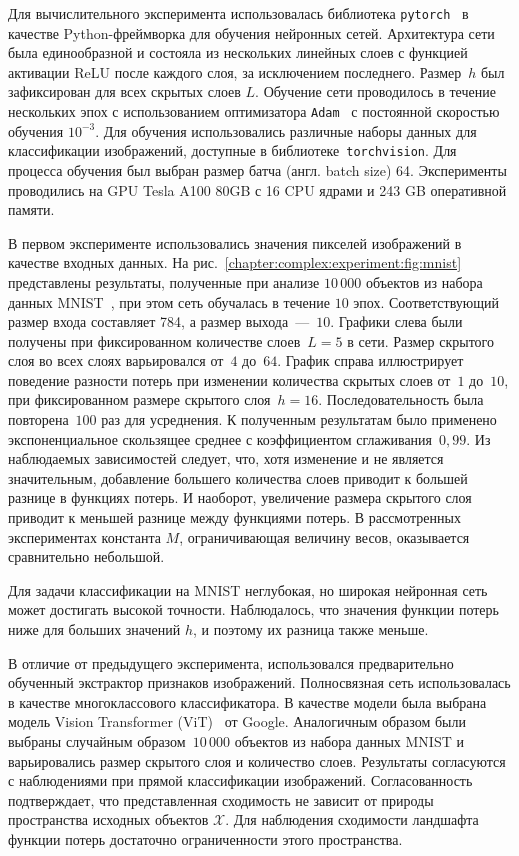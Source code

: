 Для вычислительного эксперимента использовалась библиотека \texttt{pytorch}~\cite{pytorch2019} в качестве Python-фреймворка для обучения нейронных сетей.
Архитектура сети была единообразной и состояла из нескольких линейных слоев с функцией активации ReLU после каждого слоя, за исключением последнего.
Размер~$h$ был зафиксирован для всех скрытых слоев $L$.
Обучение сети проводилось в течение нескольких эпох с использованием оптимизатора \texttt{Adam}~\cite{adam2015} с постоянной скоростью обучения $10^{-3}$.
Для обучения использовались различные наборы данных для классификации изображений, доступные в библиотеке~\texttt{torchvision}.
Для процесса обучения был выбран размер батча (англ. batch size) 64.
Эксперименты проводились на GPU Tesla A100 80GB с 16 CPU ядрами и 243 GB оперативной памяти.

В первом эксперименте использовались значения пикселей изображений в качестве входных данных. На рис.~\ref{chapter:complex:experiment:fig:mnist} представлены результаты, полученные при анализе $10\,000$ объектов из набора данных MNIST~\cite{deng2012mnist}, при этом сеть обучалась в течение $10$ эпох. Соответствующий размер входа составляет 784, а размер выхода~---~$10$. Графики слева были получены при фиксированном количестве слоев~$L=5$ в сети. Размер скрытого слоя во всех слоях варьировался от~$4$ до~$64$. График справа иллюстрирует поведение разности потерь при изменении количества скрытых слоев от~$1$ до~$10$, при фиксированном размере скрытого слоя~$h=16$. Последовательность была повторена~$100$ раз для усреднения. К полученным результатам было применено экспоненциальное скользящее среднее с коэффициентом сглаживания~$0{,}99$.
Из наблюдаемых зависимостей следует, что, хотя изменение и не является значительным, добавление большего количества слоев приводит к большей разнице в функциях потерь. И наоборот, увеличение размера скрытого слоя приводит к меньшей разнице между функциями потерь. В рассмотренных экспериментах константа $M$, ограничивающая величину весов, оказывается сравнительно небольшой.

Для задачи классификации на MNIST неглубокая, но широкая нейронная сеть может достигать высокой точности. Наблюдалось, что значения функции потерь ниже для больших значений $h$, и поэтому их разница также меньше.

В отличие от предыдущего эксперимента, использовался предварительно обученный экстрактор признаков изображений. Полносвязная сеть использовалась в качестве многоклассового классификатора. В качестве модели была выбрана модель Vision Transformer (ViT)~\cite{wu2020visual} от Google. Аналогичным образом были выбраны случайным образом~$10\,000$ объектов из набора данных MNIST и варьировались размер скрытого слоя и количество слоев. Результаты согласуются с наблюдениями при прямой классификации изображений. Согласованность подтверждает, что представленная сходимость не зависит от природы пространства исходных объектов $\mathcal{X}$. Для наблюдения сходимости ландшафта функции потерь достаточно ограниченности этого пространства.

